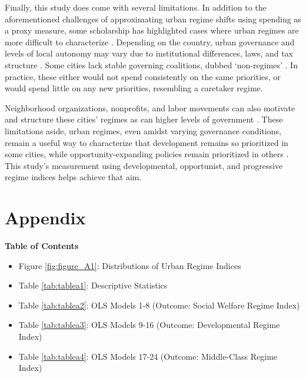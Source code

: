\documentclass[preprint, 3p,
authoryear]{elsarticle} %
\begin{document}
Finally, this study does come with several limitations. In addition to
the aforementioned challenges of approximating urban regime shifts using
spending as a proxy measure, some scholarship has highlighted cases
where urban regimes are more difficult to characterize
\citep{deleon_1992, shin_et_al_2015, davies_and_blanco_2017, russo_and_scarnato_2018}.
Depending on the country, urban governance and levels of local autonomy
may vary due to institutional differences, laws, and tax structure
\citep{sellers_2002, sorensen_2011}. Some cities lack stable governing
coalitions, dubbed `non-regimes' \citep{mossberger_2009}. In practice,
these either would not spend consistently on the same priorities, or
would spend little on any new priorities, resembling a caretaker regime.

Neighborhood organizations, nonprofits, and labor movements can also
motivate and structure these cities' regimes
\citep{logan_and_rabrenovic_1990, nissen_1995, takao_2006, camou_2014, stone_et_al_2015}
as can higher levels of government
\citep{sellers_2002, tsukamoto_2012, shin_et_al_2015}. These limitations
aside, urban regimes, even amidst varying governance conditions, remain
a useful way to characterize that development remains so prioritized in
some cities, while opportunity-expanding policies remain prioritized in
others \citep{funck_2007, ji_and_imai_2022}. This study's measurement
using developmental, opportunist, and progressive regime indices helps
achieve that aim.

\singlespacing

\newpage

\hypertarget{appendix}{%
\section*{Appendix}\label{appendix}}

\large
\doublespacing

\textbf{Table of Contents}

\large

\begin{itemize}
\item
  Figure \ref{fig:figure_A1}: Distributions of Urban Regime Indices
\item
  Table \ref{tab:tablea1}: Descriptive Statistics
\item
  Table \ref{tab:tablea2}: OLS Models 1-8 (Outcome: Social Welfare
  Regime Index)
\item
  Table \ref{tab:tablea3}: OLS Models 9-16 (Outcome: Developmental
  Regime Index)
\item
  Table \ref{tab:tablea4}: OLS Models 17-24 (Outcome: Middle-Class
  Regime Index)
\end{itemize}
\end{document}
